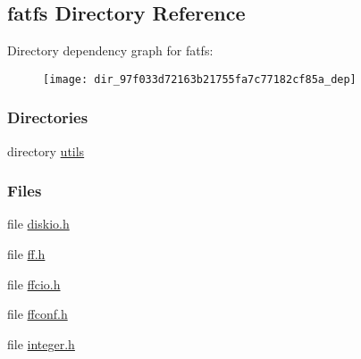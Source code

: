 \subsection{fatfs Directory Reference}
\label{dir_97f033d72163b21755fa7c77182cf85a}
Directory dependency graph for fatfs\+:
\nopagebreak
\begin{figure}[H]
\begin{center}
\leavevmode
\texttt{[image: dir\_97f033d72163b21755fa7c77182cf85a\_dep]}
\end{center}
\end{figure}
\subsubsection*{Directories}
\begin{DoxyCompactItemize}
\item 
directory \hyperlink{dir_14e19f5dc8b378750c3c1fb7ece3c7ee}{utils}
\end{DoxyCompactItemize}
\subsubsection*{Files}
\begin{DoxyCompactItemize}
\item 
file \hyperlink{diskio_8h}{diskio.\+h}
\item 
file \hyperlink{ff_8h}{ff.\+h}
\item 
file \hyperlink{ffcio_8h}{ffcio.\+h}
\item 
file \hyperlink{ffconf_8h}{ffconf.\+h}
\item 
file \hyperlink{integer_8h}{integer.\+h}
\end{DoxyCompactItemize}
